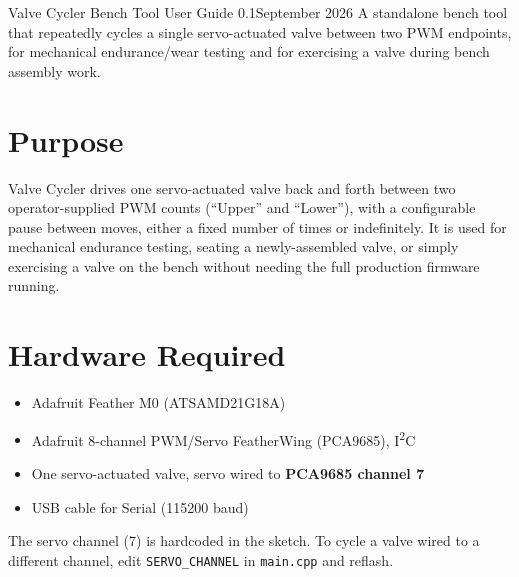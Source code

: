 \documentclass[11pt,letterpaper]{article}
\newcommand{\docversion}{0.1}
\newcommand{\docdate}{September 2026}
\begin{document}


\KJOtitlepage%
  {Valve Cycler}%
  {Bench Tool User Guide}%
  {\docversion}{\docdate}%
  {A standalone bench tool that repeatedly cycles a single servo-actuated
   valve between two PWM endpoints, for mechanical endurance/wear testing
   and for exercising a valve during bench assembly work.}

\tableofcontents\newpage

\section{Purpose}

Valve Cycler drives one servo-actuated valve back and forth between two
operator-supplied PWM counts (``Upper'' and ``Lower''), with a configurable
pause between moves, either a fixed number of times or indefinitely. It is
used for mechanical endurance testing, seating a newly-assembled valve, or
simply exercising a valve on the bench without needing the full production
firmware running.

\section{Hardware Required}

\begin{itemize}[nosep]
  \item Adafruit Feather M0 (ATSAMD21G18A)
  \item Adafruit 8-channel PWM/Servo FeatherWing (PCA9685), I\textsuperscript{2}C
  \item One servo-actuated valve, servo wired to \textbf{PCA9685 channel 7}
  \item USB cable for Serial (115200 baud)
\end{itemize}

\begin{notebox}
The servo channel (7) is hardcoded in the sketch. To cycle a valve wired to
a different channel, edit \texttt{SERVO\_CHANNEL} in \texttt{main.cpp} and
reflash.
\end{notebox}

\end{document}
